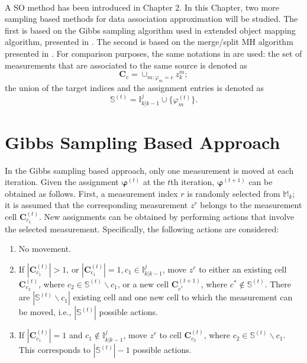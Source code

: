 ~\\
A SO method has been introduced in Chapter 2. In this Chapter, two more sampling based methods for data association approximation will be studied. The first is based on the Gibbs sampling algorithm used in extended object mapping algorithm, presented in \cite{gibbs}. The second is based on the merge/split MH algorithm presented in \cite{mergesplit}. For comparison purposes, the same notations in \cite{soextended} are used: the set of measurements that are associated to the same source is denoted as
\begin{equation}
    \mathbf{C}_c = \cup_{m:\varphi_m=c}z_k^m;
\end{equation}
the union of the target indices and the assignment entries is denoted as
\begin{equation}
    \mathbb{S}^{(t)} = \mathbb{I}^j_{k|k-1}\cup\{\varphi^{(t)}_m\}.
\end{equation}





\section{Gibbs Sampling Based Approach}
In the Gibbs sampling based approach, only one measurement is moved at each iteration. Given the assignment $\boldsymbol{\varphi}^{(t)}$ at the $t$th iteration, $\boldsymbol{\varphi}^{(t+1)}$ can be obtained as follows. First, a measurement index $r$ is randomly selected from $\mathbb{M}_k$; it is assumed that the corresponding measurement $z^r$ belongs to the measurement cell $\mathbf{C}^{(t)}_{c_1}$. New assignments can be obtained by performing actions that involve the selected measurement. Specifically, the following actions are considered:

\begin{enumerate}
    \item No movement.
    \item If $|\mathbf{C}_{c_1}^{(t)}|>1$, or $|\mathbf{C}_{c_1}^{(t)}|=1, c_1\in\mathbb{I}^j_{k|k-1}$, move $z^r$ to either an existing cell $\mathbf{C}^{(t)}_{c_2}$, where $c_2\in\mathbb{S}^{(t)}\backslash c_1$, or a new cell $\mathbf{C}_{c^*}^{(t+1)}$, where $c^*\notin\mathbb{S}^{(t)}$. There are $|\mathbb{S}^{(t)}\backslash c_1|$ existing cell and one new cell to which the measurement can be moved, i.e., $|\mathbb{S}^{(t)}|$ possible actions. 
    \item If $|\mathbf{C}_{c_1}^{(t)}|=1$ and $c_1\notin\mathbb{I}^j_{k|k-1}$, move $z^r$ to cell $\mathbf{C}^{(t)}_{c_2}$, where $c_2\in\mathbb{S}^{(t)}\backslash c_1$. This corresponds to $|\mathbb{S}^{(t)}|-1$ possible actions. 
\end{enumerate}

